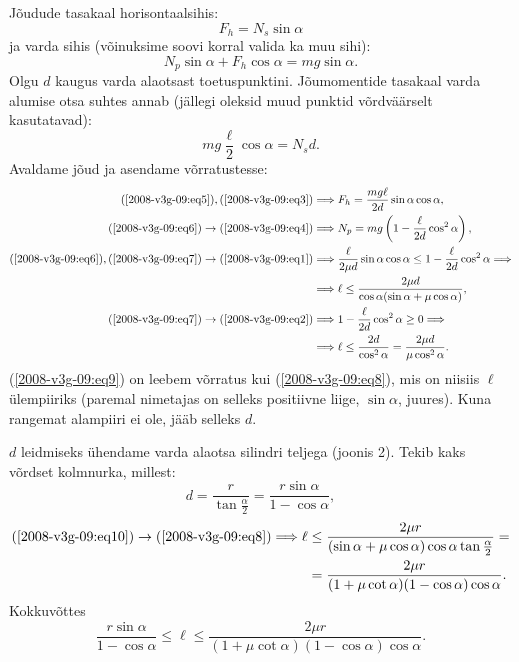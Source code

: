 \documentclass[11pt, twoside]{article}
\begin{document}
{{Jõudude tasakaal horisontaalsihis:
\begin{equation} \label{2008-v3g-09:eq3}
F_h = N_s \sin \alpha
\end{equation}
ja varda sihis (võinuksime soovi korral valida ka muu sihi):
\begin{equation} \label{2008-v3g-09:eq4}
N_p \sin \alpha + F_h \cos \alpha = mg \sin \alpha.
\end{equation}
Olgu $d$ kaugus varda alaotsast toetuspunktini. Jõumomentide tasakaal varda alumise otsa suhtes annab (jällegi oleksid muud punktid võrdväärselt kasutatavad):
\begin{equation} \label{2008-v3g-09:eq5}
mg \frac{\ell}{2} \cos \alpha = N_sd.
\end{equation}
Avaldame jõud ja asendame võrratustesse:
\begin{align}
	(\ref{2008-v3g-09:eq5}),(\ref{2008-v3g-09:eq3}) & \Longrightarrow F_{h}=\frac{m g \ell}{2 d} \sin \alpha \cos \alpha, \label{2008-v3g-09:eq6}\\
	(\ref{2008-v3g-09:eq6}) \rightarrow(\ref{2008-v3g-09:eq4}) & \Longrightarrow N_{p}=m g\left(1-\frac{\ell}{2 d} \cos ^{2} \alpha\right),\label{2008-v3g-09:eq7} \\
	(\ref{2008-v3g-09:eq6}),(\ref{2008-v3g-09:eq7}) \rightarrow(\ref{2008-v3g-09:eq1}) & \Longrightarrow \frac{\ell}{2 \mu d} \sin \alpha \cos \alpha \leq 1-\frac{\ell}{2 d} \cos ^{2} \alpha \Longrightarrow\nonumber \\ 
	& \Longrightarrow \ell \leq \frac{2 \mu d}{\cos \alpha(\sin \alpha+\mu \cos \alpha)},\label{2008-v3g-09:eq8} \\
	(\ref{2008-v3g-09:eq7}) \rightarrow(\ref{2008-v3g-09:eq2}) & \Longrightarrow 1-\frac{\ell}{2 d} \cos ^{2} \alpha \geq 0 \Longrightarrow\nonumber \\ 
	& \Longrightarrow \ell \leq \frac{2 d}{\cos ^{2} \alpha}=\frac{2 \mu d}{\mu \cos ^{2} \alpha}. \label{2008-v3g-09:eq9}
\end{align}
(\ref{2008-v3g-09:eq9}) on leebem võrratus kui (\ref{2008-v3g-09:eq8}), mis on niisiis $\ell $ ülempiiriks (paremal nimetajas on selleks positiivne liige, $\sin \alpha$, juures). Kuna rangemat alampiiri ei ole, jääb selleks $d$.

$d$ leidmiseks ühendame varda alaotsa silindri teljega (joonis 2). Tekib kaks võrdset kolmnurka, millest:
\begin{equation}\label{2008-v3g-09:eq10}
d=\frac{r}{\tan \frac{\alpha}{2}}=\frac{r \sin \alpha}{1-\cos \alpha},
\end{equation}
\[
\begin{aligned}
(\ref{2008-v3g-09:eq10}) \rightarrow(\ref{2008-v3g-09:eq8}) \Longrightarrow \ell & \leq \frac{2 \mu r}{(\sin \alpha+\mu \cos \alpha) \cos \alpha \tan \frac{\alpha}{2}}=\\
&=\frac{2 \mu r}{(1+\mu \cot \alpha)(1-\cos \alpha) \cos \alpha} .
\end{aligned}
\]
Kokkuvõttes
\[
\frac{r \sin \alpha}{1-\cos \alpha} \leq \ell \leq \frac{2 \mu r}{(1+\mu \cot \alpha)(1-\cos \alpha) \cos \alpha}.
\]

}}
\end{document}
